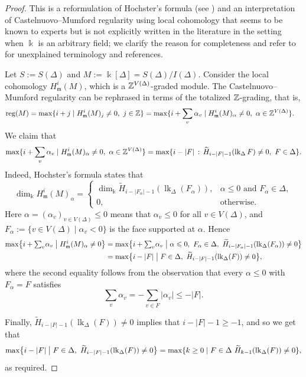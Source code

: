 \documentclass[a4paper,leqno]{amsart}
\begin{document}
\begin{proof}
This is a reformulation of Hochster's formula (see \cite{Hoc77}) and an interpretation of Castelnuovo--Mumford regularity using local cohomology that seems to be known to experts but is not explicitly written in the literature in the setting when $\Bbbk$ is an arbitrary field; we clarify the reason for completeness and refer to \cite[Section A.7]{HH11} for unexplained terminology and references.  

Let $S:=S(\Delta)$ and $M:=\Bbbk[\Delta]=S(\Delta)/I(\Delta)$.
Consider the local cohomology $H^i_{\mathfrak{m}}(M)$, which is a $\mathbb{Z}^{V(\Delta)}$-graded module.  The Castelnuovo--Mumford regularity can be rephrased in terms of the totalized $\mathbb{Z}$-grading, that is,
\begin{align*}
\operatorname{reg}(M) 
&=\max\{i+j\mid H^i_{\mathfrak m}(M)_j\neq 0, \ j\in \ZZ\}
=\max \{ i+\sum_v \alpha_v \mid H^i_{\mathfrak m}(M)_\alpha \neq 0, \ \alpha\in \ZZ^{V(\Delta)}\}.
\end{align*}
We claim that
\[
\max \{ i+\sum_v \alpha_v \mid H^i_{\mathfrak m}(M)_\alpha \neq 0, \ \alpha\in \ZZ^{V(\Delta)}\}
=\max\{i-|F| \,:\, \widetilde H_{i-|F|-1}(\operatorname{lk}_\Delta F)\neq0,\ F\in \Delta\}.
\]
Indeed, Hochster's formula \cite[Theorem A.7.3]{HH11} states that
\begin{equation}\label{eq:hochster-local-cohomology}
\dim_{\Bbbk}H^i_{\mathfrak m}(M)_\alpha=
\begin{cases}
\dim_{\Bbbk}\widetilde H_{i-|F_\alpha|-1}(\operatorname{lk}_\Delta(F_\alpha)), & \alpha\leq0\text{ and }F_\alpha\in \Delta,\\
0, & \text{otherwise}.
\end{cases}
\end{equation}
Here $\alpha =(\alpha_v)_{v\in V(\Delta)} \le 0$ means that $\alpha_v\le 0$ for all $v\in V(\Delta)$, and $F_\alpha:=\{v\in V(\Delta)\mid\alpha_v<0\}$ is the face supported at $\alpha$.  Hence
\begin{align*}
\max\bigl\{i+{\textstyle\sum_v}\alpha_v \bigm| H^i_{\mathfrak m}(M)_\alpha\neq0\bigr\}
&=\max\bigl\{i+{\textstyle\sum_v}\alpha_v \bigm| \alpha\leq0,\ F_\alpha\in \Delta,\ \widetilde H_{i-|F_\alpha|-1}(\operatorname{lk}_\Delta (F_\alpha))\neq0\bigr\}\\
&=\max\bigl\{i-|F| \bigm| F\in \Delta,\ \widetilde H_{i-|F|-1}(\operatorname{lk}_\Delta(F))\neq0\bigr\},
\end{align*}
where the second equality follows from the observation that every $\alpha\leq0$ with $F_\alpha=F$ satisfies
\[
\sum_v\alpha_v=-\sum_{v\in F}|\alpha_v|\leq-|F|.
\]

Finally, $\widetilde{H}_{i-|F|-1}(\operatorname{lk}_\Delta (F))\neq 0$ implies that $i-|F|-1\ge -1$, and so we get that
\[
\max\bigl\{i-|F| \bigm| F\in \Delta,\ \widetilde H_{i-|F|-1}(\operatorname{lk}_\Delta (F))\neq0\bigr\} = \max \{ k\ge 0 \mid F\in \Delta\ \widetilde H_{k-1}(\operatorname{lk}_\Delta (F))\neq0 \}, 
\]
as required.
\end{proof}
\end{document}
